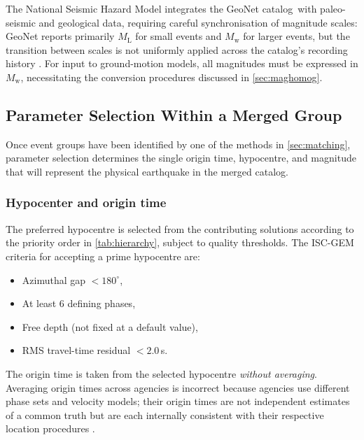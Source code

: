 \documentclass[12pt]{article}
\newcommand{\catalog}{catalog}
\begin{document}
The National Seismic Hazard Model \citep{NSHM2022BSSA} integrates the GeoNet
\catalog\ with paleo-seismic and geological data, requiring careful
synchronisation of magnitude scales: GeoNet reports primarily $M_\mathrm{L}$
for small events and $M_\mathrm{w}$ for larger events, but the transition
between scales is not uniformly applied across the \catalog's recording history
\citep{GeoNetLocationInfo}.  For input to ground-motion models, all magnitudes
must be expressed in $M_\mathrm{w}$, necessitating the conversion procedures
discussed in \cref{sec:maghomog}.

\subsection{Parameter Selection Within a Merged Group}
\label{sec:selection}

Once event groups have been identified by one of the methods in
\cref{sec:matching}, parameter selection determines the single origin time,
hypocentre, and magnitude that will represent the physical earthquake in the
merged \catalog.

\subsubsection{Hypocenter and origin time}

The preferred hypocentre is selected from the contributing solutions according
to the priority order in \cref{tab:hierarchy}, subject to quality thresholds.
The ISC-GEM criteria for accepting a prime hypocentre
\citep{ISCGEM2018, Bondar2011} are:

\begin{itemize}
  \item Azimuthal gap $< 180^\circ$,
  \item At least 6 defining phases,
  \item Free depth (not fixed at a default value),
  \item RMS travel-time residual $< 2.0$\,s.
\end{itemize}

The origin time is taken from the selected hypocentre \emph{without averaging}.
Averaging origin times across agencies is incorrect because agencies use
different phase sets and velocity models; their origin times are not independent
estimates of a common truth but are each internally consistent with their
respective location procedures \citep{Storchak2013}.
\end{document}
